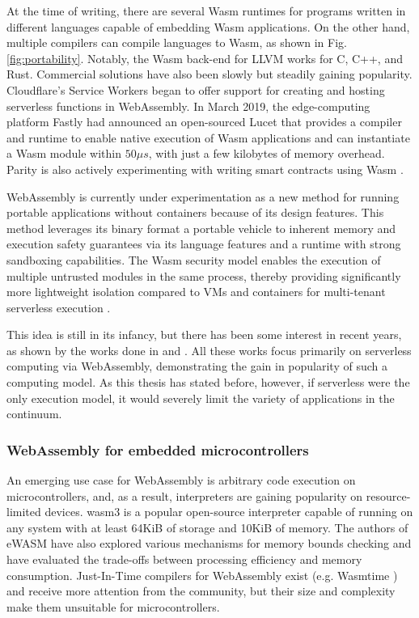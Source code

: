 At the time of writing, there are several Wasm runtimes for programs written in different languages capable of embedding Wasm applications. On the other hand, multiple compilers can compile languages to Wasm, as shown in Fig. \ref{fig:portability}. Notably, the Wasm back-end for LLVM \cite{llvm} works for C, C++, and Rust. Commercial solutions have also been slowly but steadily gaining popularity. Cloudflare's Service Workers \cite{cloudflare-workers} began to offer support for creating and hosting serverless functions in WebAssembly. In March 2019, the edge-computing platform Fastly had announced an open-sourced Lucet \cite{fastly-lucet} that provides a compiler and runtime to enable native execution of Wasm applications and can instantiate a Wasm module within $50\mu s$, with just a few kilobytes of memory overhead. Parity is also actively experimenting with writing smart contracts using Wasm \cite{parity-wasm}.

WebAssembly is currently under experimentation as a new method for running portable applications without containers because of its design features. This method leverages its binary format a portable vehicle to inherent memory and execution safety guarantees via its language features and a runtime with strong sandboxing capabilities. The Wasm security model enables the execution of multiple untrusted modules in the same process, thereby providing significantly more lightweight isolation compared to VMs and containers for multi-tenant serverless execution \cite{sledge}.

This idea is still in its infancy, but there has been some interest in recent years, as shown by the works done in \cite{execution-model-serverless-edge} and \cite{faasm}. All these works focus primarily on serverless computing via WebAssembly, demonstrating the gain in popularity of such a computing model. As this thesis has stated before, however, if serverless were the only execution model, it would severely limit the variety of applications in the continuum.

\subsubsection{WebAssembly for embedded microcontrollers}

An emerging use case for WebAssembly is arbitrary code execution on microcontrollers, and, as a result, interpreters are gaining popularity on resource-limited devices. wasm3 \cite{wasm3} is a popular open-source interpreter capable of running on any system with at least 64KiB of storage and 10KiB of memory. The authors of eWASM \cite{ewasm} have also explored various mechanisms for memory bounds checking and have evaluated the trade-offs between processing efficiency and memory consumption. Just-In-Time compilers for WebAssembly exist (e.g. Wasmtime \cite{wasmtime}) and receive more attention from the community, but their size and complexity make them unsuitable for microcontrollers.

